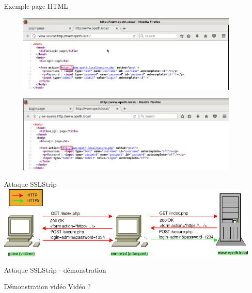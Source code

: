 \begin{frame}{Exemple page HTML}
  \begin{figure}
    \includegraphics[width=0.9\linewidth]{../medias/sslstrip/screen2.png}
  \end{figure}
  \begin{figure}
    \includegraphics[width=0.9\linewidth]{../medias/sslstrip/screen5.png}
  \end{figure}
\end{frame}



\begin{frame}{Attaque SSLStrip}
    \includegraphics[width=\linewidth]{../medias/sslstrip/attack.png}
\end{frame}


\begin{frame}{Attaque SSLStrip - démonstration}
  \begin{block}{Démonstration vidéo}
    Vidéo ?
  \end{block}
\end{frame}

